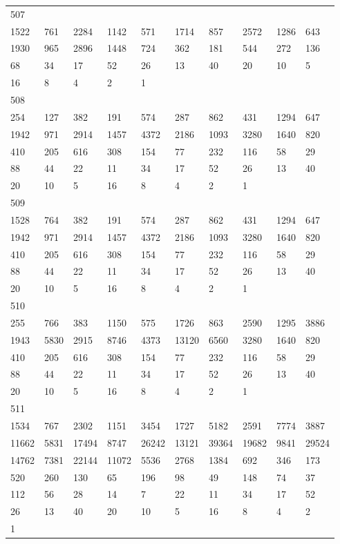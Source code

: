 \begin{longtable}{*{10}{l}}
507&&&&&&&&&\\
1522& 761& 2284& 1142& 571& 1714& 857& 2572& 1286& 643\\
1930& 965& 2896& 1448& 724& 362& 181& 544& 272& 136\\
68& 34& 17& 52& 26& 13& 40& 20& 10& 5\\
16& 8& 4& 2& 1& \\

508&&&&&&&&&\\
254& 127& 382& 191& 574& 287& 862& 431& 1294& 647\\
1942& 971& 2914& 1457& 4372& 2186& 1093& 3280& 1640& 820\\
410& 205& 616& 308& 154& 77& 232& 116& 58& 29\\
88& 44& 22& 11& 34& 17& 52& 26& 13& 40\\
20& 10& 5& 16& 8& 4& 2& 1& \\

509&&&&&&&&&\\
1528& 764& 382& 191& 574& 287& 862& 431& 1294& 647\\
1942& 971& 2914& 1457& 4372& 2186& 1093& 3280& 1640& 820\\
410& 205& 616& 308& 154& 77& 232& 116& 58& 29\\
88& 44& 22& 11& 34& 17& 52& 26& 13& 40\\
20& 10& 5& 16& 8& 4& 2& 1& \\

510&&&&&&&&&\\
255& 766& 383& 1150& 575& 1726& 863& 2590& 1295& 3886\\
1943& 5830& 2915& 8746& 4373& 13120& 6560& 3280& 1640& 820\\
410& 205& 616& 308& 154& 77& 232& 116& 58& 29\\
88& 44& 22& 11& 34& 17& 52& 26& 13& 40\\
20& 10& 5& 16& 8& 4& 2& 1& \\

511&&&&&&&&&\\
1534& 767& 2302& 1151& 3454& 1727& 5182& 2591& 7774& 3887\\
11662& 5831& 17494& 8747& 26242& 13121& 39364& 19682& 9841& 29524\\
14762& 7381& 22144& 11072& 5536& 2768& 1384& 692& 346& 173\\
520& 260& 130& 65& 196& 98& 49& 148& 74& 37\\
112& 56& 28& 14& 7& 22& 11& 34& 17& 52\\
26& 13& 40& 20& 10& 5& 16& 8& 4& 2\\
1& \\


\end{longtable}

